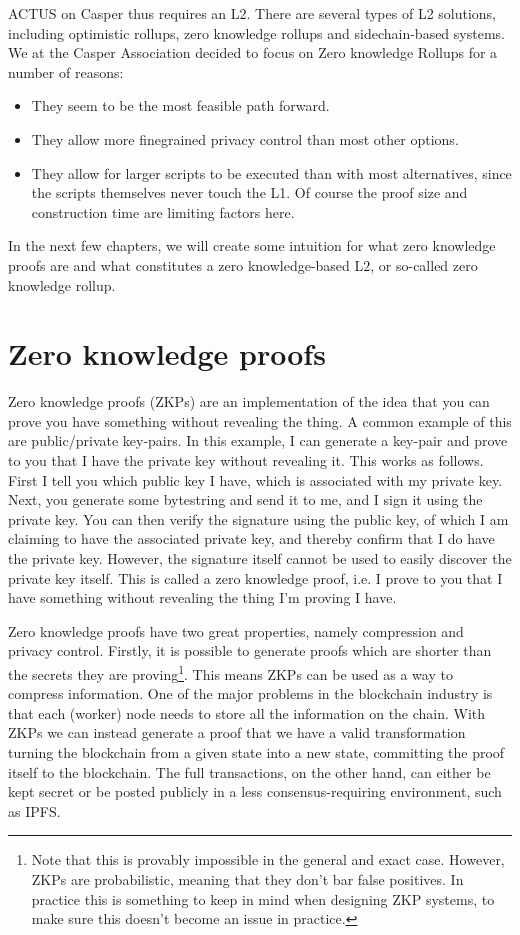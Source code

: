 \documentclass[12pt]{article}
\def\bi{\begin{itemize}}
\def\ei{\end{itemize}}
\begin{document}
ACTUS on Casper thus requires an L$2$. There are several types of L2 solutions,
including optimistic rollups, zero knowledge rollups and sidechain-based
systems. We at the Casper Association decided to focus on Zero knowledge Rollups
for a number of reasons:
\bi
  \item They seem to be the most feasible path forward.
  \item They allow more finegrained privacy control than most other options.
  \item They allow for larger scripts to be executed than with most
    alternatives, since the scripts themselves never touch the L1. Of course the
    proof size and construction time are limiting factors here.
\ei

In the next few chapters, we will create some intuition for what zero knowledge
proofs are and what constitutes a zero knowledge-based L$2$, or so-called zero
knowledge rollup.

\section{Zero knowledge proofs} \label{zkp}

Zero knowledge proofs (ZKPs) are an implementation of the idea that you can
prove you have something without revealing the thing. A common example of this
are public/private key-pairs. In this example, I can generate a key-pair and
prove to you that I have the private key without revealing it. This works as
follows. First I tell you which public key I have, which is associated with my
private key. Next, you generate some bytestring and send it to me, and I sign it
using the private key. You can then verify the signature using the public key,
of which I am claiming to have the associated private key, and thereby confirm
that I do have the private key. However, the signature itself cannot be used to
easily discover the private key itself. This is called a zero knowledge proof,
i.e. I prove to you that I have something without revealing the thing I'm
proving I have.

Zero knowledge proofs have two great properties, namely compression and privacy
control. Firstly, it is possible to generate proofs which are shorter than the
secrets they are proving\footnote{
  Note that this is provably impossible in the general and exact case. However,
  ZKPs are probabilistic, meaning that they don't bar false positives. In
  practice this is something to keep in mind when designing ZKP systems, to make
  sure this doesn't become an issue in practice.
}. This means ZKPs can be used as a way to compress information. One of the
major problems in the blockchain industry is that each (worker) node needs to
store all the information on the chain. With ZKPs we can instead generate a
proof that we have a valid transformation turning the blockchain from a given
state into a new state, committing the proof itself to the blockchain. The full
transactions, on the other hand, can either be kept secret or be posted publicly
in a less consensus-requiring environment, such as IPFS.
\end{document}
